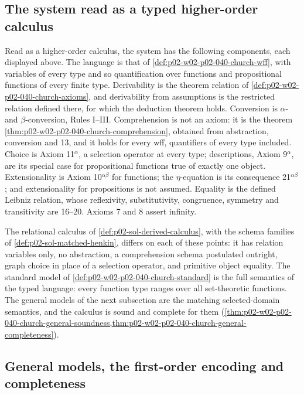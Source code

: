 \subsection{The system read as a typed higher-order calculus}

Read as a higher-order calculus, the system has the following components,
each displayed above.  The language is that of
\cref{def:p02-w02-p02-040-church-wff}, with variables of every type and so
quantification over functions and propositional functions of every finite
type.  Derivability is the theorem relation of
\cref{def:p02-w02-p02-040-church-axioms}, and derivability from assumptions
is the restricted relation defined there, for which the deduction theorem
holds.  Conversion is \(\alpha\)- and \(\beta\)-conversion, Rules I--III.
Comprehension is not an axiom: it is the theorem
\cref{thm:p02-w02-p02-040-church-comprehension}, obtained from abstraction,
conversion and 13, and it holds for every wff, quantifiers of every type
included.  Choice is Axiom 11\(^\alpha\), a selection operator at every type;
descriptions, Axiom 9\(^\alpha\), are its special case for propositional
functions true of exactly one object.  Extensionality is Axiom
10\(^{\alpha\beta}\) for functions; the \(\eta\)-equation is its consequence
21\(^{\alpha\beta}\); and extensionality for propositions is not assumed.
Equality is the defined Leibniz relation, whose reflexivity, substitutivity,
congruence, symmetry and transitivity are 16--20.  Axioms 7 and 8 assert
infinity.

The relational calculus of \cref{def:p02-sol-derived-calculus}, with
the schema families of \cref{def:p02-sol-matched-henkin}, differs on
each of these points: it has relation variables only, no abstraction, a
comprehension schema postulated outright, graph choice in place of a
selection operator, and primitive object equality.  The standard model of
\cref{def:p02-w02-p02-040-church-standard} is the full semantics of the
typed language: every function type ranges over all set-theoretic
functions.  The general models of the next subsection are the matching
selected-domain semantics, and the calculus is sound and complete for them
(\cref{thm:p02-w02-p02-040-church-general-soundness,thm:p02-w02-p02-040-church-general-completeness}).

\subsection{General models, the first-order encoding and completeness}
\label{sec:p02-w02-p02-040-church-general}

